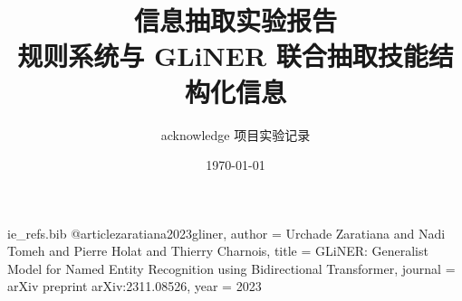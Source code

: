 \begin{filecontents*}{ie_refs.bib}
@article{zaratiana2023gliner,
  author  = {Urchade Zaratiana and Nadi Tomeh and Pierre Holat and Thierry Charnois},
  title   = {GLiNER: Generalist Model for Named Entity Recognition using Bidirectional Transformer},
  journal = {arXiv preprint arXiv:2311.08526},
  year    = {2023}
}
\end{filecontents*}

\documentclass[UTF8,a4paper,12pt]{ctexart}

\usepackage[a4paper,margin=2.2cm]{geometry}
\usepackage{amsmath,amssymb,bm}
\usepackage{booktabs}
\usepackage{array}
\usepackage{float}
\usepackage{caption}
\usepackage{hyperref}
\usepackage{xcolor}
\usepackage{listings}
\usepackage[ruled,vlined,linesnumbered]{algorithm2e}
\usepackage{tikz}
\usepackage{pgfplots}
\usepackage{enumitem}  %
\usepackage{url}       %
\usepackage{listings}
\lstset{
  basicstyle=\ttfamily,
  breaklines=true,          %
  breakatwhitespace=false,  %
  columns=fullflexible,     %
  showstringspaces=false
}
\usetikzlibrary{arrows.meta,positioning,shapes.geometric,fit}
\pgfplotsset{compat=1.18}

\hypersetup{
  colorlinks=true,
  linkcolor=blue!45!black,
  citecolor=blue!45!black,
  urlcolor=blue!45!black
}



\DontPrintSemicolon
\SetAlFnt{\small}
\renewcommand{\algorithmcfname}{算法}

\title{信息抽取实验报告\\规则系统与 GLiNER 联合抽取技能结构化信息}
\author{acknowledge 项目实验记录}
\date{\today}

\makeatletter
\newcommand{\makecoverpage}{
\begin{titlepage}
\centering
\vspace*{2.2cm}
{\zihao{2}\bfseries 课程实验报告\par}
\vspace{1.8cm}
{\zihao{1}\bfseries \@title\par}
\vspace{2.2cm}
\renewcommand{\arraystretch}{1.7}
\begin{tabular}{>{\bfseries}p{3cm}p{8cm}}
组号： & 第15组 \\
成员一： & 张明辉-2023211959 \\
成员二： & 杨佳怡-2023212446 \\
日期： & \@date \\
\end{tabular}
\vfill
{\zihao{4} acknowledge 项目实验记录\par}
\end{titlepage}
}
\makeatother


